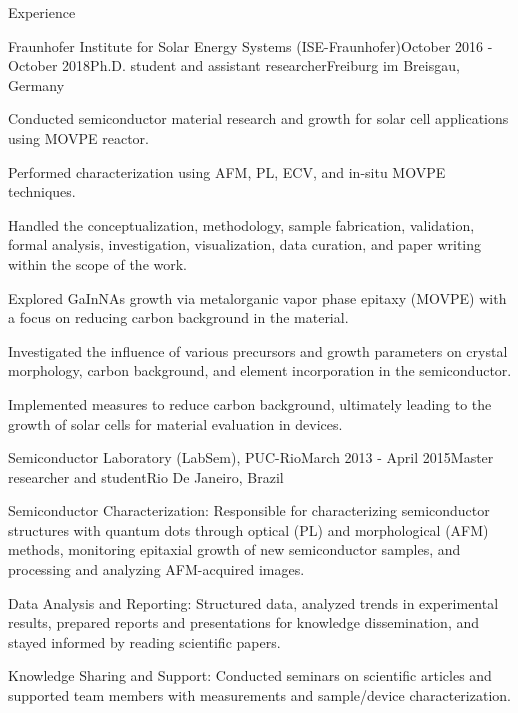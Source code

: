 \documentclass{resume} %
\begin{document}
\begin{rSection}{Experience}
        \begin{rSubsection}{Fraunhofer Institute for Solar Energy Systems (ISE-Fraunhofer)}{October 2016 - October 2018}{Ph.D. student and assistant researcher}{Freiburg im Breisgau, Germany}
            {\normalfont 
            \item Conducted semiconductor material research and growth for solar cell applications using MOVPE reactor.
            \item Performed characterization using AFM, PL, ECV, and in-situ MOVPE techniques.
            \item Handled the conceptualization, methodology, sample fabrication, validation, formal analysis, investigation, visualization, data curation, and paper writing within the scope of the work.
            \item Explored GaInNAs growth via metalorganic vapor phase epitaxy (MOVPE) with a focus on reducing carbon background in the material.
            \item Investigated the influence of various precursors and growth parameters on crystal morphology, carbon background, and element incorporation in the semiconductor.
            \item Implemented measures to reduce carbon background, ultimately leading to the growth of solar cells for material evaluation in devices.
            }
        \end{rSubsection}
        
        \begin{rSubsection}{Semiconductor Laboratory (LabSem), PUC-Rio}{March  2013 - April 2015}{Master researcher and student}{Rio De Janeiro, Brazil}
            {\normalfont 
            \item Semiconductor Characterization: Responsible for characterizing semiconductor structures with quantum dots through optical (PL) and morphological (AFM) methods, monitoring epitaxial growth of new semiconductor samples, and processing and analyzing AFM-acquired images.
            \item Data Analysis and Reporting: Structured data, analyzed trends in experimental results, prepared reports and presentations for knowledge dissemination, and stayed informed by reading scientific papers.
            \item Knowledge Sharing and Support: Conducted seminars on scientific articles and supported team members with measurements and sample/device characterization.
            }
        \end{rSubsection}


\end{rSection}
\end{document}
